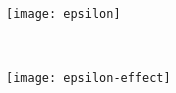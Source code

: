 \begin{figure}[!ht]
	\centering
	\begin{minipage}{0.48\textwidth}
		\centering
		\texttt{[image: epsilon]}
		\label{figure:epsilon}
	\end{minipage}
	~ %
	\begin{minipage}{0.48\textwidth}
		\centering
		\texttt{[image: epsilon-effect]}
		\label{figure:epsilon-effect}
	\end{minipage}
\end{figure}
